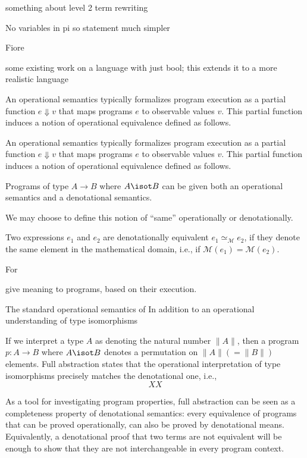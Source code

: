 something about level 2 term rewriting


No variables in pi so statement much simpler

Fiore

some existing work on a language with just bool; this extends it to a more
realistic language


An operational semantics typically formalizes
program execution as a partial function $e \Downarrow v$ that maps programs $e$
to observable values $v$. This partial function induces a notion of operational
equivalence defined as follows.



An operational semantics typically formalizes
program execution as a partial function $e \Downarrow v$ that maps programs $e$
to observable values $v$. This partial function induces a notion of operational
equivalence defined as follows.



Programs of type $A \rightarrow B$ where $A \isot B$ can be given both an
operational semantics and a denotational semantics.


We may choose to define this notion of ``same'' operationally or
denotationally.


\begin{definition}
  Two expressions $e_1$ and $e_2$ are denotationally equivalent
  $e_1 \simeq_{\mathcal{M}} e_2$, if they denote the same element in the
  mathematical domain, i.e., if $\mathcal{M}(e_1) = \mathcal{M}(e_2)$.
\end{definition}

For


give meaning to programs, based on their execution.

The standard operational semantics of In addition to an operational understanding of type isomorphisms

If we interpret a type $A$ as denoting the natural number $\| A \|$, then a
program $p : A \rightarrow B$ where $A \isot B$ denotes a permutation on
$\| A \| (= \| B \|)$ elements. Full abstraction states that the operational
interpretation of type isomorphisms precisely matches the denotational one,
i.e.,
\[
XX
\]

As a tool for investigating program properties, full abstraction can be seen as
a completeness property of denotational semantics: every equivalence of programs
that can be proved operationally, can also be proved by denotational
means. Equivalently, a denotational proof that two terms are not equivalent will
be enough to show that they are not interchangeable in every program context.

